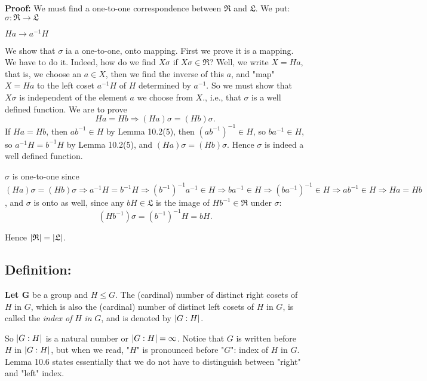 \documentclass[11pt]{amsbook}
\DeclarePairedDelimiter{\abs}{\lvert}{\rvert}
\begin{document}
\textbf{Proof:} We must find a one-to-one correspondence between $\mathfrak{R}$ and $\mathfrak{L}$.
We put: \hspace{7em}$\sigma :\mathfrak{R} \rightarrow \mathfrak{L}$

\hspace{8em} $H a \rightarrow a^{-1} H$ 

We show that $\sigma$ ia a one-to-one, onto mapping. First we prove it is a mapping. We have to do it. Indeed, how do we find $X\sigma$ if $X \sigma \in \mathfrak{R}$? Well, we write $X = H a $, that is, we choose an $a \in X $, then we find the inverse of this $a$, and "map" $X = H a $ to the left coset $a^{-1} H $ of $H$ determined by $a^{-1}$. So we must show that $X \sigma$ is independent of the element $a$ we choose from $X$., i.e., that $\sigma$ is a well defined function. We are to prove
\[
    H a = H b \Rightarrow (H a) \sigma = (H b) \sigma .
\]
If $H a = H b$, then $ a b^{-1} \in H$ by Lemma 10.2(5), then $(ab^{-1})^{-1} \in H $, so $ba^{-1} \in H$, so $a^{-1} H = b^{-1} H$ by Lemma 10.2(5), and $(H a) \sigma = (H b) \sigma$. Hence $\sigma$ is indeed a well defined function. 

$\sigma$ is one-to-one since $( H a) \sigma = (H b) \sigma \Rightarrow a^{-1} H = b^{-1} H \Rightarrow (b^{-1})^{-1} a^{-1} \in H \Rightarrow b a^{-1} \in H \Rightarrow (b a^{-1})^{-1} \in H \Rightarrow a b^{-1} \in H \Rightarrow H a = H b$, and $\sigma$ is onto as well, since any $b H \in \mathfrak{L}$ is the image of $H b^{-1} \in \mathfrak{R}$ under $\sigma$:
\[
    (H b^{-1} ) \sigma = (b^{-1})^{-1} H = bH.
\]

Hence $\abs{\mathfrak{R}} = \abs{\mathfrak{L}}$.

\hfill\break
\subsection{Definition:} %
\textbf{Let G} be a group and $H \leq G$. The (cardinal) number of distinct right cosets of $H$ in $G$, which is also the (cardinal) number of distinct left cosets of $H$ in $G$, is called the \textit{index of} $H$ \textit{in} $G$, and is denoted by $\abs{G:H}$. 

\hfill\break

So $\abs{G:H}$ is a natural number or $\abs{G:H} = \infty$. Notice that $G$ is written before $H$ in $\abs{G:H}$, but when we read, "$H$" is pronounced before "$G$": index of $H$ in $G$. Lemma 10.6 states essentially that we do not have to distinguish between "right" and "left" index.
\end{document}
